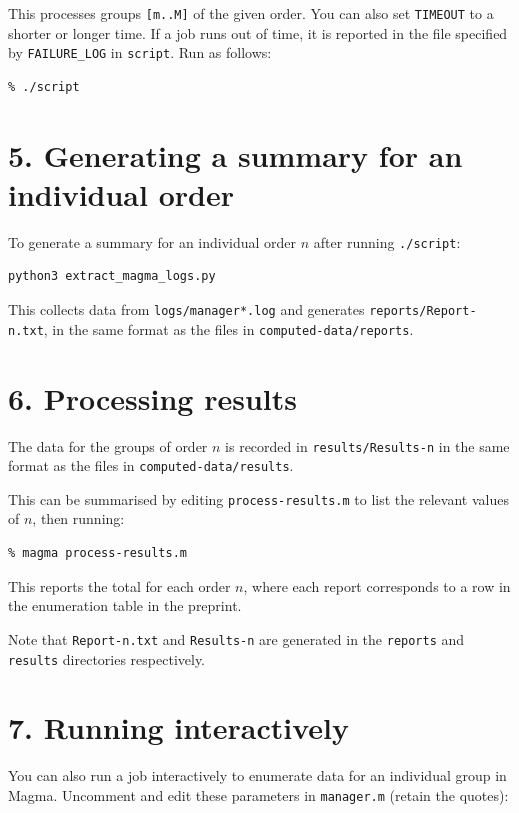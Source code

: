 \documentclass[a4paper,11pt]{article}
\begin{document}
This processes groups \texttt{[m..M]} of the given order. You can also set \texttt{TIMEOUT} to a shorter or longer time. If a job runs out of time, it is reported in the file specified by \texttt{FAILURE\_LOG} in \texttt{script}. Run as follows:

\begin{lstlisting}
% ./script
\end{lstlisting}

\section*{5. Generating a summary for an individual order}

To generate a summary for an individual order $n$ after running \texttt{./script}:

\begin{lstlisting}
python3 extract_magma_logs.py
\end{lstlisting}

This collects data from \texttt{logs/manager*.log} and generates 
\texttt{reports/Report-n.txt}, 
in the same format as the 
files in \texttt{computed-data/reports}.

\section*{6. Processing results}

The data for the groups of order $n$ is recorded in 
\texttt{results/Results-n}
in the same format as the 
files in \texttt{computed-data/results}.


This can be summarised by editing \texttt{process-results.m} to list the relevant values of $n$, then running:

\begin{lstlisting}
% magma process-results.m 
\end{lstlisting}

This reports the total for each order $n$, where each report corresponds to a row in the enumeration table in the preprint.

Note that \texttt{Report-n.txt} and \texttt{Results-n} are generated in the \texttt{reports} and \texttt{results} directories respectively.

\section*{7. Running interactively}

You can also run a job interactively to enumerate data for an individual group in Magma. Uncomment and edit these parameters in \texttt{manager.m} (retain the quotes):
\end{document}
